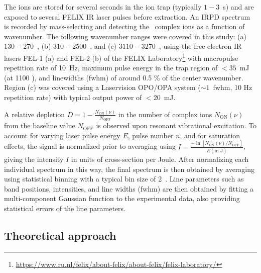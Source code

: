 The ions are stored for several seconds in the ion trap (typically $1-3$~s) and are exposed to several FELIX IR laser pulses before extraction. An IRPD spectrum is recorded by mass-selecting and detecting the \neion\ complex ions as a function of wavenumber. The following wavenumber ranges were covered in this study: (a) $130 - 270$~\wn, (b) $310 - 2500$~\wns, and (c) $3110 - 3270$~\wn, using the free-electron IR lasers FEL-1 (a) and FEL-2 (b) of the FELIX Laboratory\footnote{\url{https://www.ru.nl/felix/about-felix/about-felix/felix-laboratory/}} with macropulse repetition rate of 10~Hz, maximum pulse energy in the trap region of $< 35$~mJ (at 1100 \wn), and linewidths (fwhm) of around 0.5 \% of the center wavenumber.  Region (c) was covered using a Laservision OPO/OPA system ($\sim 1$~\wns  fwhm, 10 Hz repetition rate) with typical output power of $<20$~mJ. 

A relative depletion $D=1-\frac{N_\mathrm{ON}(\nu)}{N_\mathrm{OFF}}$ in the number of complex ions $N_\mathrm{ON}(\nu)$ from the baseline value $N_\mathrm{OFF}$ is observed upon resonant vibrational excitation. To account for varying laser pulse energy $E$, pulse number $n$, and for saturation effects, the signal is normalized prior to averaging using $I=\frac{-\ln[N_\mathrm{ON}(\nu)/N_\mathrm{OFF}]}{E(\text{in J})}$, giving the intensity $I$ in units of cross-section per Joule. After normalizing each individual spectrum in this way, the final spectrum is then obtained by averaging using statistical binning with a typical bin size of 2~\wn. Line parameters such as band positions, intensities, and line widths (fwhm) are then obtained by fitting a multi-component Gaussian function to the experimental data, also providing statistical errors of the line parameters.

\subsection{Theoretical approach}

